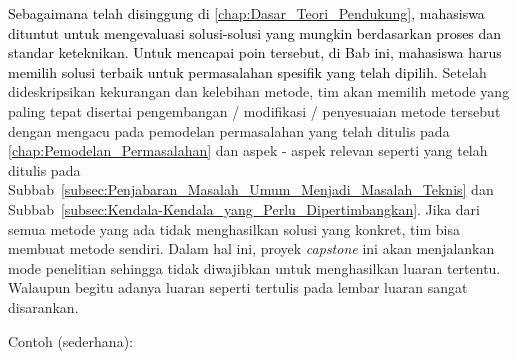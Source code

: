\textcolor{black}{Sebagaimana telah disinggung di \ref{chap:Dasar_Teori_Pendukung}, mahasiswa dituntut untuk mengevaluasi solusi-solusi yang mungkin berdasarkan proses dan standar keteknikan. Untuk mencapai poin tersebut, di Bab ini, mahasiswa harus memilih solusi terbaik untuk permasalahan spesifik yang telah dipilih.} Setelah dideskripsikan kekurangan dan kelebihan metode, tim akan memilih metode yang paling tepat disertai pengembangan / modifikasi / penyesuaian metode tersebut dengan mengacu pada pemodelan permasalahan yang telah ditulis pada \ref{chap:Pemodelan_Permasalahan} dan aspek - aspek relevan seperti yang telah ditulis pada Subbab~\ref{subsec:Penjabaran_Masalah_Umum_Menjadi_Masalah_Teknis} dan Subbab~\ref{subsec:Kendala-Kendala_yang_Perlu_Dipertimbangkan}. Jika dari semua metode yang ada tidak menghasilkan solusi yang konkret, tim bisa membuat metode sendiri. Dalam hal ini, proyek \textit{capstone} ini akan menjalankan mode penelitian sehingga tidak diwajibkan untuk menghasilkan luaran tertentu. Walaupun begitu adanya luaran seperti tertulis pada lembar luaran sangat disarankan.
\vspace{6pt}

\noindent
Contoh (sederhana):

